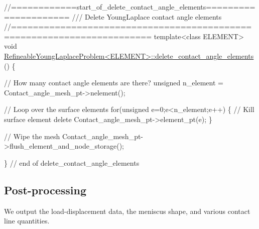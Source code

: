 \begin{DoxyCodeInclude}
\textcolor{comment}{//============start\_of\_delete\_contact\_angle\_elements=====================}
\textcolor{comment}{/// Delete YoungLaplace contact angle elements}
\textcolor{comment}{}\textcolor{comment}{//=======================================================================}
\textcolor{keyword}{template}<\textcolor{keyword}{class} ELEMENT>
\textcolor{keywordtype}{void} \hyperlink{classRefineableYoungLaplaceProblem_aaa270ba8da395897a5a99d052f076e0c}{RefineableYoungLaplaceProblem<ELEMENT>::delete\_contact\_angle\_elements}
      ()
\{

 \textcolor{comment}{// How many contact angle elements are there?}
 \textcolor{keywordtype}{unsigned} n\_element = Contact\_angle\_mesh\_pt->nelement();

 \textcolor{comment}{// Loop over the surface elements}
 \textcolor{keywordflow}{for}(\textcolor{keywordtype}{unsigned} e=0;e<n\_element;e++)
  \{
   \textcolor{comment}{// Kill surface element}
   \textcolor{keyword}{delete} Contact\_angle\_mesh\_pt->element\_pt(e);
  \}

 \textcolor{comment}{// Wipe the mesh}
 Contact\_angle\_mesh\_pt->flush\_element\_and\_node\_storage();


\} \textcolor{comment}{// end of delete\_contact\_angle\_elements}

\end{DoxyCodeInclude}




 

\hypertarget{index_doc}{}\subsection{Post-\/processing}\label{index_doc}
We output the load-\/displacement data, the meniscus shape, and various contact line quantities.


